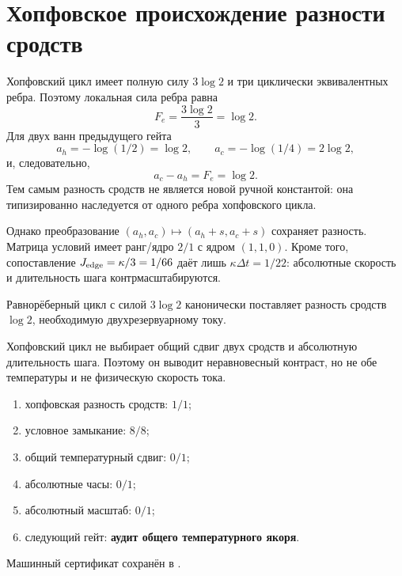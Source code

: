 \chapter{Хопфовское происхождение разности сродств}
\label{ch:v10-two-reservoir-hopf-affinity}

Хопфовский цикл имеет полную силу $3\log2$ и три циклически эквивалентных
ребра. Поэтому локальная сила ребра равна
\begin{equation}
 F_e=\frac{3\log2}{3}=\log2.
\end{equation}
Для двух ванн предыдущего гейта
\begin{equation}
 a_h=-\log(1/2)=\log2,\qquad
 a_c=-\log(1/4)=2\log2,
\end{equation}
и, следовательно,
\begin{equation}
 \boxed{a_c-a_h=F_e=\log2}.
\end{equation}
Тем самым разность сродств не является новой ручной константой: она
типизированно наследуется от одного ребра хопфовского цикла.

Однако преобразование $(a_h,a_c)\mapsto(a_h+s,a_c+s)$ сохраняет разность.
Матрица условий имеет ранг/ядро $2/1$ с ядром $(1,1,0)$. Кроме того,
сопоставление $J_{\rm edge}=\kappa/3=1/66$ даёт лишь
$\kappa\Delta t=1/22$: абсолютные скорость и длительность шага
контрмасштабируются.

\begin{theorem}
Равнорёберный цикл с силой $3\log2$ канонически поставляет разность
сродств $\log2$, необходимую двухрезервуарному току.
\end{theorem}

\begin{nogocriterion}
Хопфовский цикл не выбирает общий сдвиг двух сродств и абсолютную длительность
шага. Поэтому он выводит неравновесный контраст, но не обе температуры и не
физическую скорость тока.
\end{nogocriterion}

\begin{protocol}\begin{enumerate}
\item хопфовская разность сродств: \textbf{$1/1$};
\item условное замыкание: \textbf{$8/8$};
\item общий температурный сдвиг: \textbf{$0/1$};
\item абсолютные часы: \textbf{$0/1$};
\item абсолютный масштаб: \textbf{$0/1$};
\item следующий гейт: \textbf{аудит общего температурного якоря}.
\end{enumerate}\end{protocol}

Машинный сертификат сохранён в
.